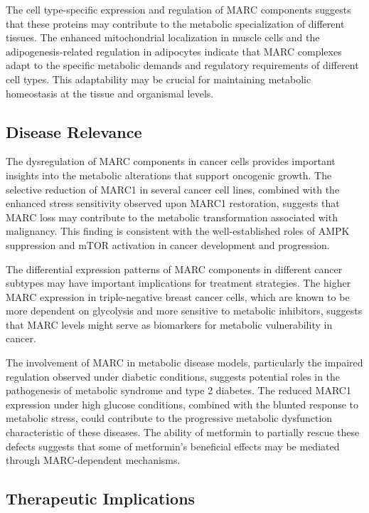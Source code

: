 \documentclass[11pt,a4paper]{article}
\begin{document}
The cell type-specific expression and regulation of MARC components suggests that these proteins may contribute to the metabolic specialization of different tissues. The enhanced mitochondrial localization in muscle cells and the adipogenesis-related regulation in adipocytes indicate that MARC complexes adapt to the specific metabolic demands and regulatory requirements of different cell types. This adaptability may be crucial for maintaining metabolic homeostasis at the tissue and organismal levels.

\subsection{Disease Relevance}

The dysregulation of MARC components in cancer cells provides important insights into the metabolic alterations that support oncogenic growth. The selective reduction of MARC1 in several cancer cell lines, combined with the enhanced stress sensitivity observed upon MARC1 restoration, suggests that MARC loss may contribute to the metabolic transformation associated with malignancy. This finding is consistent with the well-established roles of AMPK suppression and mTOR activation in cancer development and progression.

The differential expression patterns of MARC components in different cancer subtypes may have important implications for treatment strategies. The higher MARC expression in triple-negative breast cancer cells, which are known to be more dependent on glycolysis and more sensitive to metabolic inhibitors, suggests that MARC levels might serve as biomarkers for metabolic vulnerability in cancer.

The involvement of MARC in metabolic disease models, particularly the impaired regulation observed under diabetic conditions, suggests potential roles in the pathogenesis of metabolic syndrome and type 2 diabetes. The reduced MARC1 expression under high glucose conditions, combined with the blunted response to metabolic stress, could contribute to the progressive metabolic dysfunction characteristic of these diseases. The ability of metformin to partially rescue these defects suggests that some of metformin's beneficial effects may be mediated through MARC-dependent mechanisms.

\subsection{Therapeutic Implications}
\end{document}
